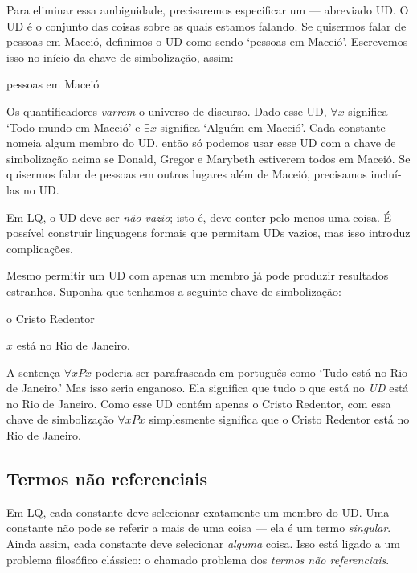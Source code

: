 Para eliminar essa ambiguidade, precisaremos especificar um  — abreviado UD. O UD é o conjunto das coisas sobre as quais estamos falando. Se quisermos falar de pessoas em Maceió, definimos o UD como sendo `pessoas em Maceió'. Escrevemos isso no início da chave de simbolização, assim:
\begin{ekey}
\item[UD:] pessoas em Maceió
\end{ekey}
Os quantificadores \emph{varrem} o universo de discurso. Dado esse UD, $\forall x$ significa `Todo mundo em Maceió' e $\exists x$ significa `Alguém em Maceió'. Cada constante nomeia algum membro do UD, então só podemos usar esse UD com a chave de simbolização acima se Donald, Gregor e Marybeth estiverem todos em Maceió. Se quisermos falar de pessoas em outros lugares além de Maceió, precisamos incluí-las no UD.

Em LQ, o UD deve ser \emph{não vazio}; isto é, deve conter pelo menos uma coisa. É possível construir linguagens formais que permitam UDs vazios, mas isso introduz complicações.

Mesmo permitir um UD com apenas um membro já pode produzir resultados estranhos. Suponha que tenhamos a seguinte chave de simbolização:
\begin{ekey}
\item[UD:] o Cristo Redentor
\item[Px:] $x$ está no Rio de Janeiro.
\end{ekey}
A sentença $\forall x Px$ poderia ser parafraseada em português como `Tudo está no Rio de Janeiro.' Mas isso seria enganoso. Ela significa que tudo o que está no \emph{UD} está no Rio de Janeiro. Como esse UD contém apenas o Cristo Redentor, com essa chave de simbolização $\forall x Px$ simplesmente significa que o Cristo Redentor está no Rio de Janeiro.


\subsection{Termos não referenciais}
Em LQ, cada constante deve selecionar exatamente um membro do UD. Uma constante não pode se referir a mais de uma coisa — ela é um termo \emph{singular}. Ainda assim, cada constante deve selecionar \emph{alguma} coisa. Isso está ligado a um problema filosófico clássico: o chamado problema dos \emph{termos não referenciais}.

